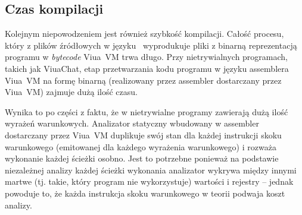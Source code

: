 \subsection{Czas kompilacji}

Kolejnym niepowodzeniem jest również szybkość kompilacji. Całość procesu, który
z plików źródłowych w języku \ViuAct\ wyprodukuje pliki z binarną reprezentacją
programu w \emph{bytecode} Viua~VM trwa długo. Przy nietrywialnych programach,
takich jak ViuaChat, etap przetwarzania kodu programu w języku assemblera
Viua~VM na formę binarną (realizowany przez assembler dostarczany przez Viua~VM)
zajmuje dużą ilość czasu.

Wynika to po części z faktu, że w nietrywialne programy zawierają dużą ilość
wyrażeń warunkowych. Analizator statyczny wbudowany w assembler dostarczany
przez Viua~VM duplikuje swój stan dla każdej instrukcji skoku warunkowego
(emitowanej dla każdego wyrażenia warunkowego) i rozważa wykonanie każdej
ścieżki osobno.
Jest to potrzebne ponieważ na podstawie niezależnej analizy każdej ścieżki
wykonania analizator wykrywa między innymi martwe (tj. takie, który program nie
wykorzystuje) wartości i rejestry -- jednak powoduje to, że każda instrukcja
skoku warunkowego w teorii podwaja koszt analizy.



